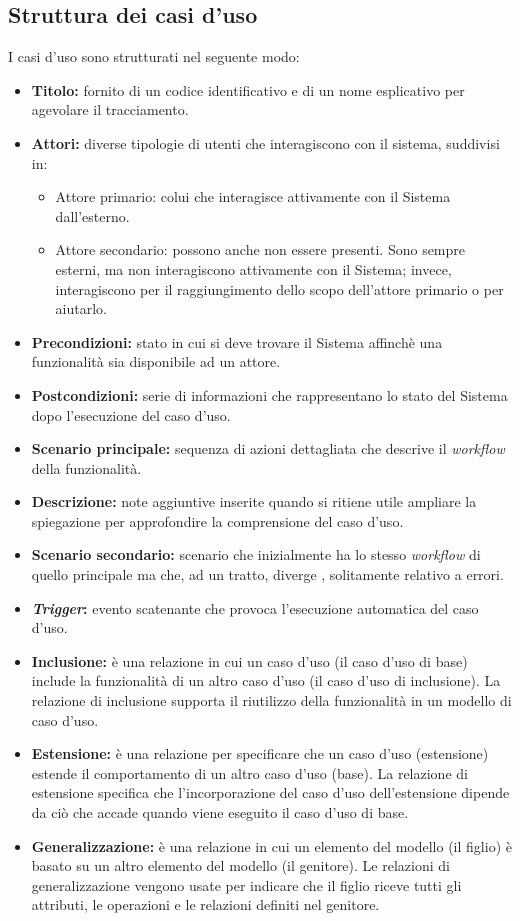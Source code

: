 \subsection{Struttura dei casi d'uso}
I casi d'uso sono strutturati nel seguente modo:
\begin{itemize}
	\item \textbf{Titolo:} fornito di un codice identificativo e di un nome esplicativo per agevolare il tracciamento.
	\item \textbf{Attori:} diverse tipologie di utenti che interagiscono con il sistema, suddivisi in:
	\begin{itemize}
		\item Attore primario: colui che interagisce attivamente con il Sistema dall'esterno.
		\item Attore secondario: possono anche non essere presenti. 
		Sono sempre esterni, ma non interagiscono attivamente con il Sistema; invece, interagiscono per il raggiungimento dello scopo dell'attore primario o per aiutarlo.
	\end{itemize}
	\item \textbf{Precondizioni:} stato in cui si deve trovare il Sistema affinchè una funzionalità sia disponibile ad un attore.
	\item \textbf{Postcondizioni:} serie di informazioni che rappresentano lo stato del Sistema dopo l'esecuzione del caso d'uso.
	\item \textbf{Scenario principale:} sequenza di azioni dettagliata che descrive il \textit{workflow} della funzionalità.
	\item \textbf{Descrizione:} note aggiuntive inserite quando si ritiene utile ampliare la spiegazione per approfondire la comprensione del caso d'uso.
	\item \textbf{Scenario secondario:} scenario che inizialmente ha lo stesso \textit{workflow} di quello principale ma che, ad un tratto, diverge , solitamente relativo a errori.
	\item \textbf{\textit{Trigger}:} evento scatenante che provoca l'esecuzione automatica del caso d'uso.
	\item \textbf{Inclusione:} è una relazione in cui un caso d'uso (il caso d'uso di base) include la funzionalità di un altro caso d'uso (il caso d'uso di inclusione). 
		La relazione di inclusione supporta il riutilizzo della funzionalità in un modello di caso d'uso.
	\item \textbf{Estensione:} è una relazione per specificare che un caso d'uso (estensione) estende il comportamento di un altro caso d'uso (base).
	La relazione di estensione specifica che l'incorporazione del caso d'uso dell'estensione dipende da ciò che accade quando viene eseguito il caso d'uso di base.
	\item \textbf{Generalizzazione:} è una relazione in cui un elemento del modello (il figlio) è basato su un altro elemento del modello (il genitore). 
		Le relazioni di generalizzazione vengono usate per indicare che il figlio riceve tutti gli attributi, le operazioni e le relazioni definiti nel genitore.
\end{itemize}

